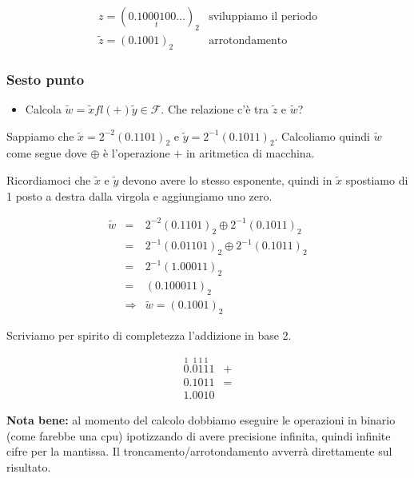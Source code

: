 \[
\begin{array}{lr}
  z = (0.100\underset{t}{0}100...)_2 & \text{sviluppiamo il periodo}\\
  \tilde{z} = (0.1001)_2 & \text{arrotondamento}
\end{array}
\]

\subsubsection{Sesto punto}
\begin{itemize}
  \item Calcola $ \tilde{w} = \tilde{x} fl(+) \tilde{y} \in \mathcal{F}$. Che relazione c'è tra $\tilde{z}$ e $\tilde{w}$?
\end{itemize}

Sappiamo che $\tilde{x} = 2^{-2}(0.1101)_2$ e $\tilde{y} = 2^{-1}(0.1011)_2$. Calcoliamo quindi $\tilde{w}$ come segue dove $\oplus$ è l'operazione $+$ in aritmetica di macchina.\bigskip

Ricordiamoci che $\tilde{x}$ e $\tilde{y}$ devono avere lo stesso esponente, quindi in $\tilde{x}$ spostiamo di 1 posto a destra dalla virgola e aggiungiamo uno zero.

\[
  \renewcommand{\arraystretch}{2.0}
\begin{array}{rcl}
  \tilde{w} &=& 2^{-2}(0.1101)_2 \oplus 2^{-1}(0.1011)_2 \\
            &=& 2^{-1}(0.01101)_2 \oplus 2^{-1}(0.1011)_2 \\
            &=& 2^{-1}(1.00011)_2 \\
            &=& (0.100011)_2 \\
            &\Rightarrow& \tilde{w} = (0.1001)_2
\end{array}
\]

Scriviamo per spirito di completezza l'addizione in base 2.

\[
  \renewcommand{\arraystretch}{1.0}
\begin{array}{lc}
  \overset{1}{0}.\overset{1}{0}\overset{1}{1}\overset{1}{1}1&+\\
  0.1011&=\\
  \hline
  1.0010&
\end{array}
\]

\textbf{Nota bene:} al momento del calcolo dobbiamo eseguire le operazioni in binario (come farebbe una cpu) ipotizzando di avere precisione infinita, quindi infinite cifre per la mantissa. Il troncamento/arrotondamento avverrà direttamente sul risultato.

